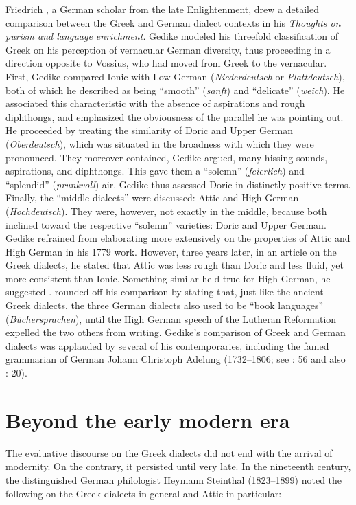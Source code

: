 Friedrich \citet[\textsc{xx}]{Gedike1779}, a German scholar from the late Enlightenment, drew a detailed comparison between the Greek and German dialect contexts in his \textit{Thoughts on purism and language enrichment}. Gedike modeled his threefold classification of Greek on his perception of vernacular German diversity, thus proceeding in a direction opposite to Vossius, who had moved from Greek to the vernacular. First, Gedike compared Ionic with Low German (\textit{Niederdeutsch} or \textit{Plattdeutsch}), both of which he described as being “smooth” (\textit{sanft}) and “delicate” (\textit{weich}). He associated this characteristic with the absence of aspirations and rough diphthongs, and emphasized the obviousness of the parallel he was pointing out. He proceeded by treating the similarity of Doric and Upper German (\textit{Oberdeutsch}), which was situated in the broadness with which they were pronounced. They moreover contained, Gedike argued, many hissing sounds, aspirations, and diphthongs. This gave them a “solemn” (\textit{feierlich}) and “splendid” (\textit{prunkvoll}) air. Gedike thus assessed Doric in distinctly positive terms. Finally, the “middle dialects” were discussed: Attic and High German (\textit{Hochdeutsch}). They were, however, not exactly in the middle, because both inclined toward the respective “solemn” varieties: Doric and Upper German. Gedike refrained from elaborating more extensively on the properties of Attic and High German in his 1779 work. However, three years later, in an article on the Greek dialects, he stated that Attic was less rough than Doric and less fluid, yet more consistent than Ionic. Something similar held true for High German, he suggested \citep[25]{Gedike1782}. \citet[\textsc{xx–xxi}]{Gedike1779} rounded off his comparison by stating that, just like the ancient Greek dialects, the three German dialects also used to be “book languages” (\textit{Büchersprachen}), until the High German speech of the Lutheran Reformation expelled the two others from writing. Gedike’s comparison of Greek and German dialects was applauded by several of his contemporaries, including the famed grammarian of German Johann Christoph Adelung (1732–1806; see \citealt{Adelung1781}: 56 and also \citealt{Moritz1781}: 20).

\section{Beyond the early modern era}\label{sec:7.4}


The evaluative discourse on the Greek dialects did not end with the arrival of modernity. On the contrary, it persisted until very late. In the nineteenth century, the distinguished German philologist Heymann Steinthal (1823–1899) noted the following on the Greek dialects in general and Attic in particular:

